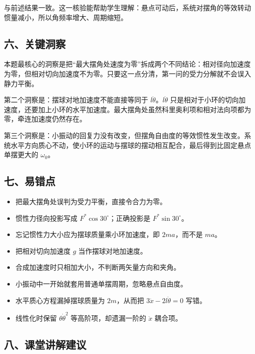 \documentclass[12pt,a4paper,UTF8]{ctexart}
\newcommand{\tightlist}{\setlength{\itemsep}{0pt}\setlength{\parskip}{0pt}}
\begin{document}
与前述结果一致。这一核验能帮助学生理解：悬点可动后，系统对摆角的等效转动惯量减小，所以角频率增大、周期缩短。

\subsection{六、关键洞察}\label{ux516dux5173ux952eux6d1eux5bdf}

本题最核心的洞察是把``最大摆角处速度为零''拆成两个不同结论：相对径向加速度为零，但相对切向加速度不为零。只要这一点分清，第一问的受力分解就不会误入静力平衡。

第二个洞察是：摆球对地加速度不能直接等同于
\(l\ddot\theta\)。\(l\ddot\theta\)
只是相对于小环的切向加速度，还要加上小环的水平加速度。最大摆角处虽然科里奥利项和相对法向项都为零，牵连加速度仍然存在。

第三个洞察是：小振动的回复力没有改变，但摆角自由度的等效惯性发生改变。系统水平方向质心不动，使小环的运动与摆球的摆动相互配合，最后得到比固定悬点单摆更大的
\(\omega_0\)。

\subsection{七、易错点}\label{ux4e03ux6613ux9519ux70b9}

\begin{itemize}
\tightlist
\item
  把最大摆角处误判为受力平衡，直接令合力为零。
\item
  惯性力径向投影写成 \(F^*\cos30^\circ\)；正确投影是
  \(F^*\sin30^\circ\)。
\item
  忘记惯性力大小应为摆球质量乘小环加速度，即 \(2ma\)，而不是 \(ma\)。
\item
  把相对切向加速度 \(g\) 当作摆球对地加速度。
\item
  合成加速度时只相加大小，不判断两矢量方向和夹角。
\item
  小振动中一开始就套用普通单摆周期，忽略悬点自由度。
\item
  水平质心方程漏掉摆球质量为 \(2m\)，从而把 \(3\ddot x-2l\ddot\theta=0\)
  写错。
\item
  线性化时保留 \(\theta\dot\theta^2\) 等高阶项，却遗漏一阶的 \(\ddot x\)
  耦合项。
\end{itemize}

\subsection{八、课堂讲解建议}\label{ux516bux8bfeux5802ux8bb2ux89e3ux5efaux8bae}
\end{document}
